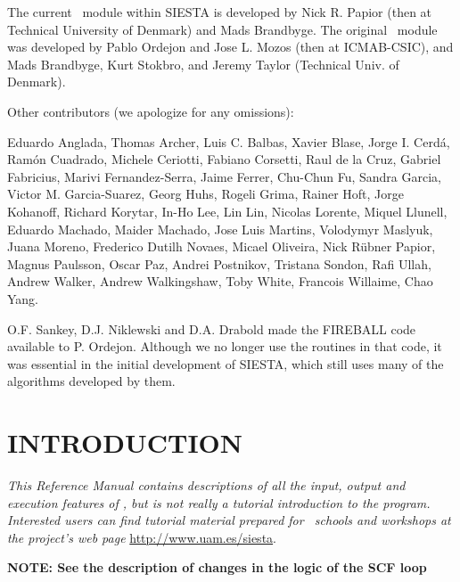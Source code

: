 The current \tsiesta\ module within SIESTA is developed by 
Nick R. Papior (then at Technical University of Denmark) and Mads Brandbyge. 
The original \tsiesta\ module was developed by
Pablo Ordejon and Jose L. Mozos (then at ICMAB-CSIC), and Mads Brandbyge,
Kurt Stokbro, and Jeremy Taylor (Technical Univ. of Denmark).

Other contributors (we apologize for any omissions):

Eduardo Anglada,
Thomas Archer,
Luis C. Balbas,
Xavier Blase,
Jorge I. Cerd\'a,
Ram\'on Cuadrado,
Michele Ceriotti,
Fabiano Corsetti,
Raul de la Cruz,
Gabriel Fabricius,
Marivi Fernandez-Serra,
Jaime Ferrer,
Chu-Chun Fu,
Sandra Garcia,
Victor M. Garcia-Suarez,
Georg Huhs,
Rogeli Grima,
Rainer Hoft,
Jorge Kohanoff,
Richard Korytar,
In-Ho Lee,
Lin Lin,
Nicolas Lorente,
Miquel Llunell,
Eduardo Machado,
Maider Machado,
Jose Luis Martins,
Volodymyr Maslyuk,
Juana Moreno,
Frederico Dutilh Novaes, 
Micael Oliveira,
Nick R\"ubner Papior,
Magnus Paulsson,
Oscar Paz,
Andrei Postnikov,
Tristana Sondon,
Rafi Ullah,
Andrew Walker,
Andrew Walkingshaw,
Toby White,
Francois Willaime,
Chao Yang.

O.F. Sankey, D.J. Niklewski and D.A. Drabold made the FIREBALL code
available to P. Ordejon.  Although we no longer use the routines in
that code, it was essential in the initial development of SIESTA,
which still uses many of the algorithms developed by them.

\tableofcontents

\newpage

\section{INTRODUCTION}

\textit{This Reference Manual contains descriptions of all the input,
  output and execution features of \siesta, but is not really a
  tutorial introduction to the program. Interested users can find
  tutorial material prepared for \siesta\ schools and workshops at
  the project's web page} \url{http://www.uam.es/siesta}.


\textbf{NOTE: See the description of changes in the logic of the SCF loop}

